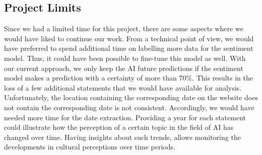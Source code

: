 \subsection{Project Limits}

Since we had a limited time for this project, there are some aspects where we would have liked to continue our work.
From a technical point of view, we would have preferred to spend additional time on labelling more data for the sentiment model.
Thus, it could have been possible to fine-tune this model as well.
With our current approach, we only keep the AI future predictions if the sentiment model makes a prediction with a certainty of more than 70\%. 
This results in the loss of a few additional statements that we would have available for analysis.
\\
Unfortunately, the location containing the corresponding date on the website does not contain the corresponding date is not consistent. 
Accordingly, we would have needed more time for the date extraction.
Providing a year for each statement could illustrate how the perception of a certain topic in the field of AI has changed over time.
Having insights about such trends, allows monitoring the developments in cultural perceptions over time periods.
\\





